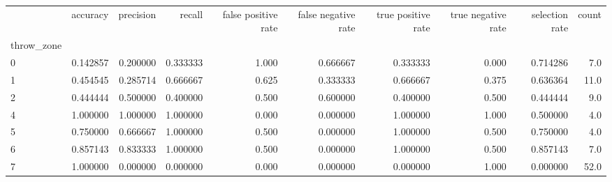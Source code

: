 \begin{tabular}{lrrrrrrrrr}
\toprule
{} &  accuracy &  precision &    recall &  false positive rate &  false negative rate &  true positive rate &  true negative rate &  selection rate &  count \\
throw\_zone &           &            &           &                      &                      &                     &                     &                 &        \\
\midrule
0          &  0.142857 &   0.200000 &  0.333333 &                1.000 &             0.666667 &            0.333333 &               0.000 &        0.714286 &    7.0 \\
1          &  0.454545 &   0.285714 &  0.666667 &                0.625 &             0.333333 &            0.666667 &               0.375 &        0.636364 &   11.0 \\
2          &  0.444444 &   0.500000 &  0.400000 &                0.500 &             0.600000 &            0.400000 &               0.500 &        0.444444 &    9.0 \\
4          &  1.000000 &   1.000000 &  1.000000 &                0.000 &             0.000000 &            1.000000 &               1.000 &        0.500000 &    4.0 \\
5          &  0.750000 &   0.666667 &  1.000000 &                0.500 &             0.000000 &            1.000000 &               0.500 &        0.750000 &    4.0 \\
6          &  0.857143 &   0.833333 &  1.000000 &                0.500 &             0.000000 &            1.000000 &               0.500 &        0.857143 &    7.0 \\
7          &  1.000000 &   0.000000 &  0.000000 &                0.000 &             0.000000 &            0.000000 &               1.000 &        0.000000 &   52.0 \\
\bottomrule
\end{tabular}
